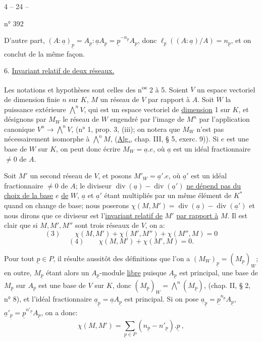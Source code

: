 \begin{center}4 -- 24 --\end{center}
\hfill n° 392

D'autre part, $(A:\underline a)_{\underline p}=A_{\underline p}:\underline a A_{\underline p}=\underline p^{-n_{\underline p}}A_{\underline p}$, donc $\ell_{\underline p}((A:\underline a)/A)=n_{\underline p}$, et on conclut de la même façon.

6. \uline{Invariant relatif de deux réseaux.}

Les notations et hypothèses sont celles des n\textsuperscript{os} 2 à 5. Soient $V$ un espace vectoriel de dimension finie $n$ sur $K$, $M$ un réseau de $V$ par rapport à $A$. Soit $W$ la puissance extérieure $\overset{n}{\bigwedge}V$, qui est un espace vectoriel de \uline{dimension} 1 sur $K$, et désignons par $M_W$ le réseau de $W$ engendré par l'image de $M^n$ par l'application canonique $V^n\to\overset{n}{\bigwedge}V$, (n° 1, prop. 3, (iii); on notera que $M_W$ n'est pas nécessairement isomorphe à $\overset{n}{\bigwedge}M$, (\uline{Alg.}, chap. III, § 5, exerc. 9)). Si $e$ est une base de $W$ sur $K$, on peut donc écrire $M_W=\underline a.e$, où $\underline a$ est un idéal fractionnaire $\ne0$ de $A$.

Soit $M'$ un second réseau de $V$, et posons $M'_W=\underline a'.e$, où $\underline a'$ est un idéal fractionnaire $\ne0$ de $A$; le diviseur $\operatorname{div}(\underline a)-\operatorname{div}(\underline a')$ \uline{ne dépend pas du choix de la base} $e$ \uline{de} $W$, $\underline a$ et $\underline a'$ étant multipliés par un même élément de $K^*$ quand on change de base; nous poserons $\chi(M,M')=\operatorname{div}(\underline a)-\operatorname{div}(\underline a')$ et nous dirons que ce diviseur est l'\uline{invariant relatif de} $M'$ \uline{par rapport à} $M$. Il est clair que si $M,M',M''$ sont trois réseaux de $V$, on a:
\[
(3)\qquad\chi(M,M')+\chi(M',M'')+\chi(M'',M)=0
\]
\[
(4)\qquad\chi(M,M')+\chi(M',M)=0.
\]

Pour tout $\underline p\in P$, il résulte aussitôt des définitions que l'on a $(M_W)_{\underline p}=(M_{\underline p})_W$; en outre, $M_{\underline p}$ étant alors un $A_{\underline p}$-module \uline{libre} puisque $A_{\underline p}$ est principal, une base de $M_{\underline p}$ sur $A_{\underline p}$ est une base de $V$ sur $K$, donc $(M_{\underline p})_W=\overset{n}{\bigwedge}(M_{\underline p})$, (chap. II, § 2, n° 8), et l'idéal fractionnaire $\underline a_{\underline p}=\underline a A_{\underline p}$ est principal. Si on pose $\underline a_{\underline p}=\underline p^{n_{\underline p}}A_{\underline p}$, $\underline a'_{\underline p}=\underline p^{n'_{\underline p}}A_{\underline p}$, on a donc:
\[
\chi(M,M')=\sum_{\underline p\in P}(n_{\underline p}-n'_{\underline p}).\underline p\ ,
\]
